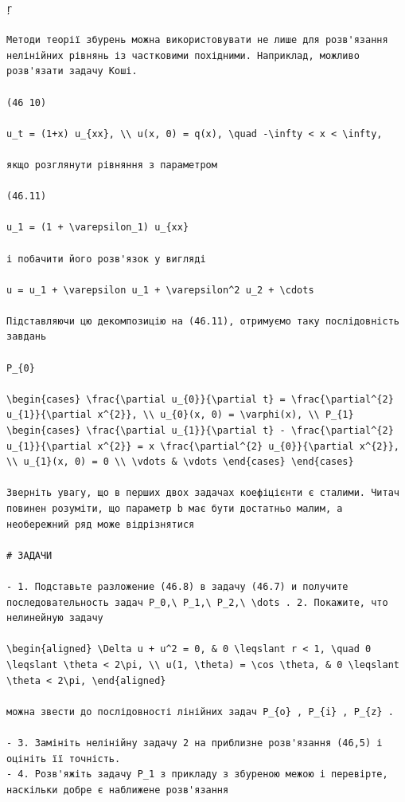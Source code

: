 \documentclass[
  ukrainian,
]{article}
\begin{document}
\begin{verbatim}
ŗ

Методи теорії збурень можна використовувати не лише для розв'язання нелінійних рівнянь із частковими похідними. Наприклад, можливо розв'язати задачу Коші.

(46 10)

u_t = (1+x) u_{xx}, \\ u(x, 0) = q(x), \quad -\infty < x < \infty,

якщо розглянути рівняння з параметром

(46.11)

u_1 = (1 + \varepsilon_1) u_{xx}

і побачити його розв'язок у вигляді

u = u_1 + \varepsilon u_1 + \varepsilon^2 u_2 + \cdots

Підставляючи цю декомпозицію на (46.11), отримуємо таку послідовність завдань

P_{0}

\begin{cases} \frac{\partial u_{0}}{\partial t} = \frac{\partial^{2} u_{1}}{\partial x^{2}}, \\ u_{0}(x, 0) = \varphi(x), \\ P_{1} \begin{cases} \frac{\partial u_{1}}{\partial t} - \frac{\partial^{2} u_{1}}{\partial x^{2}} = x \frac{\partial^{2} u_{0}}{\partial x^{2}}, \\ u_{1}(x, 0) = 0 \\ \vdots & \vdots \end{cases} \end{cases}

Зверніть увагу, що в перших двох задачах коефіцієнти є сталими. Читач повинен розуміти, що параметр b має бути достатньо малим, а необережний ряд може відрізнятися

# ЗАДАЧИ

- 1. Подставьте разложение (46.8) в задачу (46.7) и получите последовательность задач P_0,\ P_1,\ P_2,\ \dots . 2. Покажите, что нелинейную задачу

\begin{aligned} \Delta u + u^2 = 0, & 0 \leqslant r < 1, \quad 0 \leqslant \theta < 2\pi, \\ u(1, \theta) = \cos \theta, & 0 \leqslant \theta < 2\pi, \end{aligned}

можна звести до послідовності лінійних задач P_{o} , P_{i} , P_{z} .

- 3. Замініть нелінійну задачу 2 на приблизне розв'язання (46,5) і оцініть її точність.
- 4. Розв'яжіть задачу P_1 з прикладу з збуреною межою і перевірте, наскільки добре є наближене розв'язання


\end{verbatim}
\end{document}
